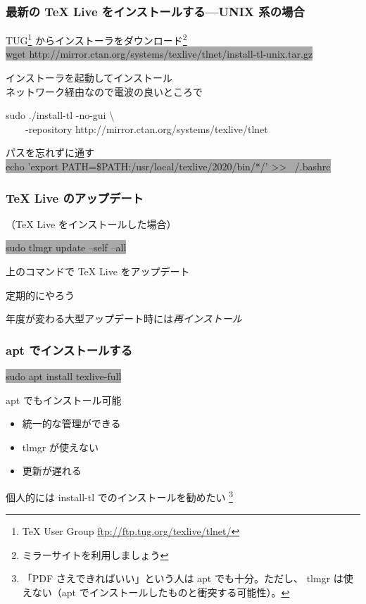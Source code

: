 \documentclass[unicode,12pt,colorlinks,handout]{beamer}
\newcommand{\nishikifont}{\nishikifonta\nishikifontj}
\newcommand{\centeralign}[1]{\rule{0pt}{0pt}\hfill#1\hfill\rule{0pt}{0pt}}
\newcommand{\typecommand}[1]{\colorbox{darkgray}{{\ttfamily\color{lime}#1}}}
\newcommand{\typecmdbox}[1]{
	\begin{tcolorbox}[
		sharp corners,left=0mm,right=0mm,top=0mm,bottom=0mm,
		colframe=darkgray,
		colback=darkgray,
	]
		{\ttfamily\color{lime}#1}
	\end{tcolorbox}
}
\begin{document}
\begin{frame}
	\frametitle{最新の {\TeX} Live をインストールする---UNIX 系の場合}
	TUG\footnote{{\TeX} User Group \url{ftp://ftp.tug.org/texlive/tlnet/}}
	からインストーラをダウンロード\footnote{ミラーサイトを利用しましょう}\\
	\typecommand{\scriptsize wget http://mirror.ctan.org/systems/texlive/tlnet/install-tl-unix.tar.gz}
	
	インストーラを起動してインストール\\
	{\small ネットワーク経由なので電波の良いところで}\\
	\typecmdbox{\scriptsize sudo ./install-tl -no-gui \textbackslash\\
	~~~~-repository http://mirror.ctan.org/systems/texlive/tlnet}
	
	パスを忘れずに通す\\
	\typecommand{\scriptsize echo 'export PATH=\$PATH:/usr/local/texlive/2020/bin/*/' >> ~/.bashrc}
\end{frame}

\begin{frame}
	\frametitle{{\TeX} Live のアップデート}
	（{\TeX} Live をインストールした場合）
	
	\centeralign{\typecommand{sudo tlmgr update --self --all}}
	
	上のコマンドで {\TeX} Live をアップデート
	
	定期的にやろう
	
	年度が変わる大型アップデート時には\emph{再インストール}
\end{frame}

\begin{frame}
	\frametitle{apt でインストールする}
	\typecommand{sudo apt install texlive-full}
	
	apt でもインストール可能
	
	\begin{itemize}
		\item 統一的な管理ができる
		\item tlmgr が使えない
		\item 更新が遅れる
	\end{itemize}
	
	個人的には install-tl でのインストールを勧めたい
	\footnote{「PDF さえできればいい」という人は apt でも十分。ただし、
	tlmgr は使えない（apt でインストールしたものと衝突する可能性）。}
\end{frame}

\frame{\section{\TeX の使い方} {\nishikifont 😀 美文書 2 章 😀}}
\end{document}
